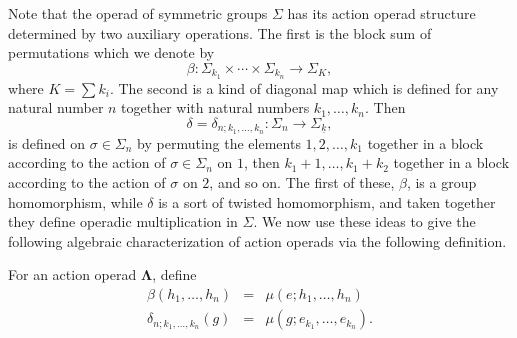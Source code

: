 \documentclass{amsbook} %
\newcommand{\mb}{\mathbf}
\numberwithin{section}{chapter}
\begin{document}
Note that the operad of symmetric groups $\Sigma$ has its action operad structure determined by two auxiliary operations.  The first is the block sum of permutations which we denote by
\[
\beta: \Sigma_{k_{1}} \times \cdots \times \Sigma_{k_{n}} \rightarrow \Sigma_{K},
\]
where $K = \sum k_{i}$.  The second is a kind of diagonal map which is defined for any natural number $n$ together with natural numbers $k_{1}, \ldots, k_{n}$.  Then
\[
\delta = \delta_{n; k_{1}, \ldots, k_{n}}:\Sigma_{n} \rightarrow \Sigma_{\underline{k}},
\]
is defined on $\sigma \in \Sigma_{n}$ by permuting the elements $1, 2, \ldots, k_{1}$ together in a block according to the action of $\sigma \in \Sigma_{n}$ on $1$, then $k_{1}+1, \ldots, k_{1}+k_{2}$ together in a block according to the action of $\sigma$ on $2$, and so on.  The first of these, $\beta$, is a group homomorphism, while $\delta$
is a sort of twisted homomorphism, and taken together they define operadic multiplication in $\Sigma$.  We now use these ideas to give the following algebraic characterization of action operads via the following definition.

\begin{Defi}\label{Defi:aop_bl}
For an action operad $\mb{\Lambda}$,  define
\[
\begin{array}{rcl}
\beta(h_{1}, \ldots, h_{n}) &=& \mu(e; h_{1}, \ldots, h_{n}) \\
\delta_{n; k_{1}, \ldots, k_{n}}(g) &=& \mu(g; e_{k_1}, \ldots, e_{k_n}).
\end{array}
\]
\end{Defi}
\end{document}
